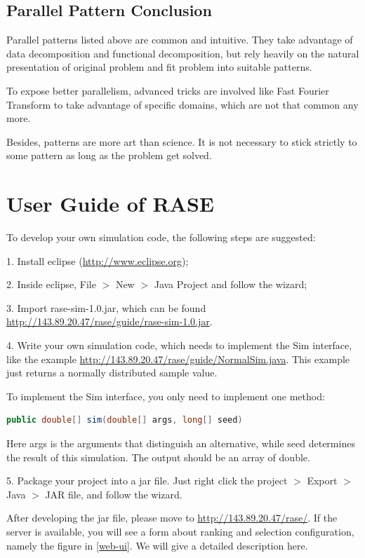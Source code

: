 \documentclass[12pt,a4paper]{report}
\begin{document}
\section{Parallel Pattern Conclusion}

Parallel patterns listed above are common and intuitive. They take advantage of data decomposition and functional decomposition, but rely heavily on the natural presentation of original problem and fit problem into suitable patterns.

To expose better parallelism, advanced tricks are involved like Fast Fourier Transform to take advantage of specific domains, which are not that common any more.

Besides, patterns are more art than science. It is not necessary to stick strictly to some pattern as long as the problem get solved.

\chapter{User Guide of RASE}

To develop your own simulation code, the following steps are suggested:

1.	Install eclipse (\url{http://www.eclipse.org});

2.	Inside eclipse, File $>$ New $>$ Java Project and follow the wizard;

3.	Import rase-sim-1.0.jar, which can be found \url{http://143.89.20.47/rase/guide/rase-sim-1.0.jar}.

4.	Write your own simulation code, which needs to implement the Sim interface, like the example \url{http://143.89.20.47/rase/guide/NormalSim.java}. This example just returns a normally distributed sample value.

To implement the Sim interface, you only need to implement one method:

\begin{lstlisting}[language=Java]
public double[] sim(double[] args, long[] seed)
\end{lstlisting}

Here args is the arguments that distinguish an alternative, while seed determines the result of this simulation. The output should be an array of double.

5.	Package your project into a jar file. Just right click the project $>$ Export $>$ Java $>$ JAR file, and follow the wizard.

After developing the jar file, please move to \url{http://143.89.20.47/rase/}. If the server is available, you will see a form about ranking and selection configuration, namely the figure in \ref{web-ui}. We will give a detailed description here.
\end{document}
